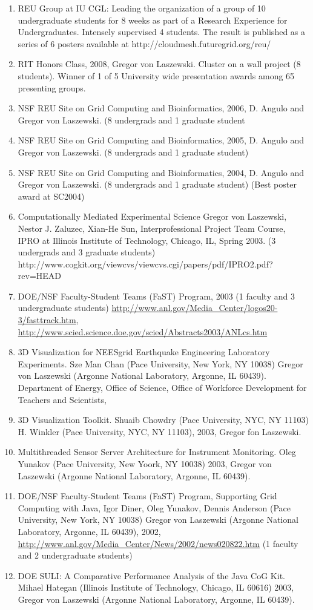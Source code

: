 \documentclass{article}
\begin{document}
\begin{enumerate}
\item  REU Group at IU CGL: Leading the organization of  a group of 10 undergraduate students for 8 weeks as part of a Research Experience for Undergraduates. Intensely supervised 4 students. The result is published as a series of 6 posters available at http://cloudmesh.futuregrid.org/reu/
\item   RIT Honors Class, 2008, Gregor von Laszewski. Cluster on a wall project (8 students). Winner of 1 of 5 University wide presentation awards among 65 presenting groups.
\item  NSF REU Site on Grid Computing and Bioinformatics, 2006, D. Angulo and Gregor von Laszewski. (8 undergrads and 1 graduate student 
\item  NSF REU Site on Grid Computing and Bioinformatics, 2005, D. Angulo and Gregor von Laszewski. (8 undergrads and 1 graduate student) 
\item  NSF REU Site on Grid Computing and Bioinformatics, 2004, D. Angulo and Gregor von Laszewski. (8 undergrads and 1 graduate student) (Best poster award at SC2004) 
\item  Computationally Mediated Experimental Science Gregor von Laszewski, Nestor J. Zaluzec, Xian-He Sun, Interprofessional Project Team Course, IPRO at Illinois Institute of Technology, Chicago, IL, Spring 2003. (3 undergrads and 3 graduate students) http://www.cogkit.org/viewcvs/viewcvs.cgi/papers/pdf/IPRO2.pdf?rev=HEAD 
\item  DOE/NSF Faculty-Student Teams (FaST) Program, 2003 (1 faculty and 3 undergraduate students) \url{http://www.anl.gov/Media_Center/logos20-3/fasttrack.htm, http://www.scied.science.doe.gov/scied/Abstracts2003/ANLcs.htm} 
\item  3D Visualization for NEESgrid Earthquake Engineering Laboratory Experiments. Sze Man Chan (Pace University, New York, NY 10038) Gregor von Laszewski (Argonne National Laboratory, Argonne, IL 60439). Department of Energy, Office of Science, Office of Workforce Development for Teachers and Scientists, 
\item  3D Visualization Toolkit. Shuaib Chowdry (Pace University, NYC, NY 11103) H. Winkler (Pace University, NYC, NY 11103), 2003, Gregor fon Laszewski. 
\item  Multithreaded Sensor Server Architecture for Instrument Monitoring. Oleg Yunakov (Pace University, New Yoork, NY 10038) 2003, Gregor von Laszewski (Argonne National Laboratory, Argonne, IL 60439). 
\item  DOE/NSF Faculty-Student Teams (FaST) Program, Supporting Grid Computing with Java, Igor Diner, Oleg Yunakov, Dennis Anderson (Pace University, New York, NY 10038) Gregor von Laszewski (Argonne National Laboratory, Argonne, IL 60439), 2002, \url{http://www.anl.gov/Media_Center/News/2002/news020822.htm} (1 faculty and 2 undergraduate students)  
\item  DOE SULI: A Comparative Performance Analysis of the Java CoG Kit. Mihael Hategan (Illinois Institute of Technology, Chicago, IL 60616) 2003, Gregor von Laszewski (Argonne National Laboratory, Argonne, IL 60439). 
\end{enumerate}
 
\end{document}

